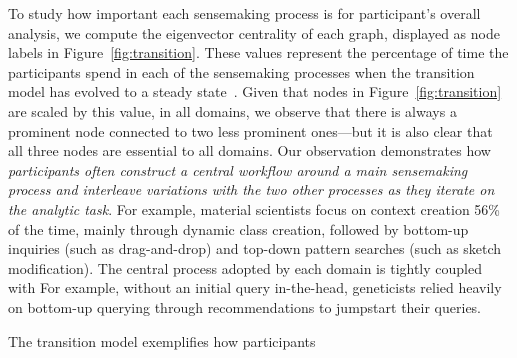 \par To study how important each sensemaking process
is for participant's overall analysis,
we compute the eigenvector centrality of each graph,
displayed as node labels in Figure~\ref{fig:transition}.
These values represent the percentage of time the participants
spend in each of the sensemaking processes
when the transition model has evolved to a steady state~\cite{pierre2011}.
Given that nodes in Figure~\ref{fig:transition}
are scaled by this value, in all domains,
we observe that there is always a prominent node
connected to two less prominent ones---but it is also clear
that all three nodes are essential to all domains.
Our observation demonstrates how \emph{participants
often construct a central workflow
around a main sensemaking process
and interleave variations with the two other processes
as they iterate on the analytic task}. For example, material scientists focus
on context creation 56\% of the time,
mainly through dynamic class creation,
followed by bottom-up inquiries (such as drag-and-drop)
 and top-down pattern searches (such as sketch modification).
The central process adopted by each domain
is tightly coupled with  For example, without an initial query in-the-head,
geneticists relied heavily on bottom-up querying
through recommendations to jumpstart their queries.
\par The  transition model exemplifies how participants
